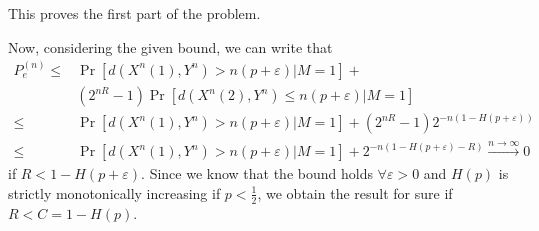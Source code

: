 This proves the first part of the problem.

Now, considering the given bound, we can write that
%
\begin{equation}
\begin{split}
P_e^{(n)} \leq& \Pr[d(X^n(1),Y^n)>n(p+\varepsilon) | M=1] +\\
	&(2^{nR}-1) \Pr[d(X^n(2),Y^n) \leq n(p+\varepsilon) | M=1] \\
\leq& \Pr[d(X^n(1),Y^n)>n(p+\varepsilon) | M=1] + (2^{nR}-1)2^{-n(1-H(p+\varepsilon))}\\
\leq& \Pr[d(X^n(1),Y^n)>n(p+\varepsilon) | M=1] + 2^{-n(1-H(p+\varepsilon)-R)}
\xrightarrow{n\rightarrow \infty} 0
\end{split}
\end{equation}
%
if $R<1-H(p+\varepsilon)$. Since we know that the bound holds $\forall \varepsilon>0$ and $H(p)$ is strictly monotonically increasing if $p<\frac{1}{2}$, we obtain the result for sure if $R<C=1-H(p)$.

